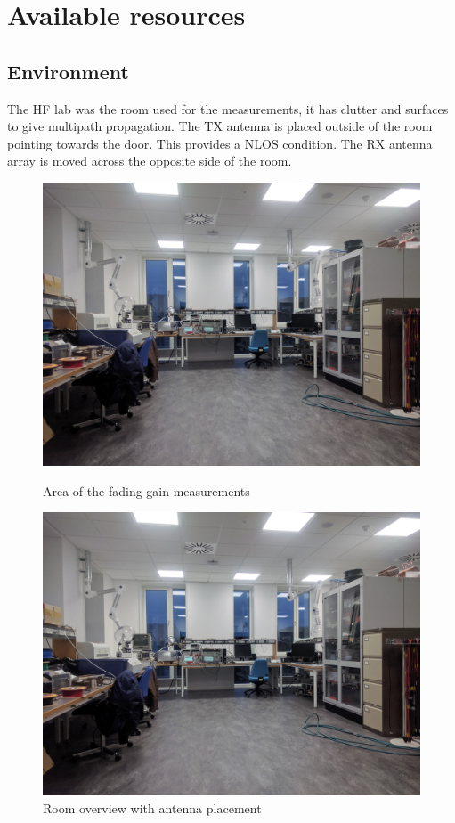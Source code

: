 \chapter{Available resources}

\section{Environment}
The HF lab was the room used for the measurements, it has  clutter and surfaces to give  multipath propagation. The TX antenna is placed outside of the room pointing towards the door. This provides a NLOS condition. The RX antenna array is moved across the opposite side of the room.

\begin{figure}[H]
  \centering
  \begin{minipage}[H]{0.4\textwidth}
    \includegraphics[width=\textwidth]{pictures/Measurement/walking_meas.jpg}
    \caption{Area of the fading gain measurements}
  \end{minipage}
  \hfill
  \begin{minipage}[H]{0.4\textwidth}
    \includegraphics[width=\textwidth]{pictures/Measurement/walking_meas.jpg}
    \caption{Room overview with antenna placement}
  \end{minipage}
\end{figure}


